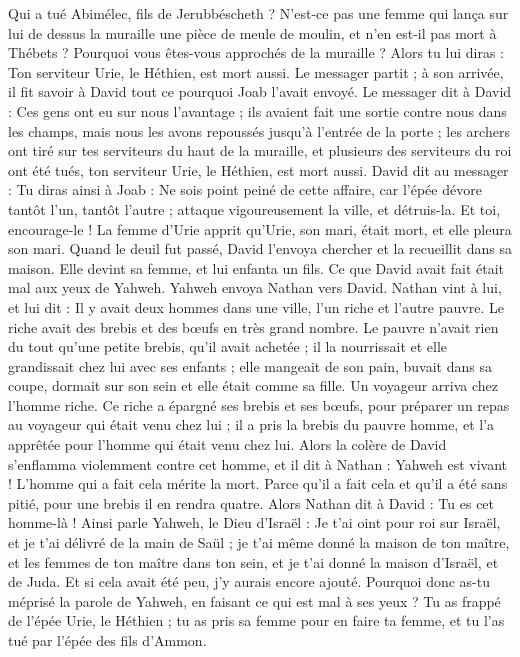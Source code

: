 \begin{multicols}{2}
Qui a tué Abimélec, fils de Jerubbéscheth ? N’est-ce pas une femme qui lança sur lui de dessus la muraille une pièce de meule de moulin, et n’en est-il pas mort à Thébets ? Pourquoi vous êtes-vous approchés de la muraille ? Alors tu lui diras : Ton serviteur Urie, le Héthien, est mort aussi.
Le messager partit ; à son arrivée, il fit savoir à David tout ce pourquoi Joab l'avait envoyé.
Le messager dit à David : Ces gens ont eu sur nous l'avantage ; ils avaient fait une sortie contre nous dans les champs, mais nous les avons repoussés jusqu'à l'entrée de la porte ;
les archers ont tiré sur tes serviteurs du haut de la muraille, et plusieurs des serviteurs du roi ont été tués, ton serviteur Urie, le Héthien, est mort aussi.
David dit au messager : Tu diras ainsi à Joab : Ne sois point peiné de cette affaire, car l'épée dévore tantôt l'un, tantôt l'autre ; attaque vigoureusement la ville, et détruis-la. Et toi, encourage-le !
La femme d'Urie apprit qu'Urie, son mari, était mort, et elle pleura son mari.
Quand le deuil fut passé, David l’envoya chercher et la recueillit dans sa maison. Elle devint sa femme, et lui enfanta un fils. Ce que David avait fait était mal aux yeux de Yahweh.
\VerseOne{}Yahweh envoya Nathan vers David. Nathan vint à lui, et lui dit : Il y avait deux hommes dans une ville, l'un riche et l'autre pauvre.
Le riche avait des brebis et des bœufs en très grand nombre.
Le pauvre n'avait rien du tout qu'une petite brebis, qu'il avait achetée ; il la nourrissait et elle grandissait chez lui avec ses enfants ; elle mangeait de son pain, buvait dans sa coupe, dormait sur son sein et elle était comme sa fille.
Un voyageur arriva chez l’homme riche. Ce riche a épargné ses brebis et ses bœufs, pour préparer un repas au voyageur qui était venu chez lui ; il a pris la brebis du pauvre homme, et l’a apprêtée pour l’homme qui était venu chez lui.
Alors la colère de David s'enflamma violemment contre cet homme, et il dit à Nathan : Yahweh est vivant ! L'homme qui a fait cela mérite la mort.
Parce qu'il a fait cela et qu’il a été sans pitié, pour une brebis il en rendra quatre.
Alors Nathan dit à David : Tu es cet homme-là ! Ainsi parle Yahweh, le Dieu d'Israël : Je t'ai oint pour roi sur Israël, et je t'ai délivré de la main de Saül ;
je t'ai même donné la maison de ton maître, et les femmes de ton maître dans ton sein, et je t'ai donné la maison d'Israël, et de Juda. Et si cela avait été peu, j’y aurais encore ajouté.
Pourquoi donc as-tu méprisé la parole de Yahweh, en faisant ce qui est mal à ses yeux ? Tu as frappé de l'épée Urie, le Héthien ; tu as pris sa femme pour en faire ta femme, et tu l'as tué par l'épée des fils d’Ammon.

\end{multicols}
